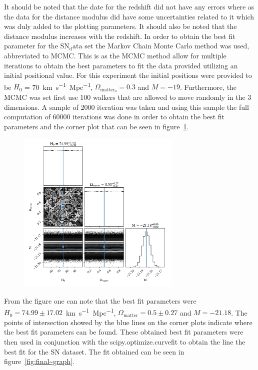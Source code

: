 \documentclass[12pt, a4paper]{article}
\begin{document}
It should be noted that the date for the redshift did not have any errors where as the data for the distance modulus did have some uncertainties related to it which was duly added to the plotting parameters. It should also be noted that the distance modulus increases with the redshift. In order to obtain the best fit parameter for the \(\mathrm{SN_data}\) set the Markov Chain Monte Carlo method was used, abbreviated to MCMC. This is as the MCMC method allow for multiple iterations to obtain the best parameters to fit the data provided utilizing an initial positional value. For this experiment the initial positions were provided to be \(H_0\) = \qty{70}{km.s^{-1}.Mpc^{-1}}, \(\Omega_{\mathrm{matter_0}} = 0.3\) and \(M=-19\). Furthermore, the MCMC was set first use 100 walkers that are allowed to move randomly in the 3 dimensions. A sample of 2000 iteration was taken and using this sample the full computation of 60000 iterations was done in order to obtain the best fit parameters and the corner plot that can be seen in figure~\ref{fig:corner~plots}. 

\begin{figure}[H]
    \centering
    \includegraphics[width = 0.7\textwidth]{Graph 4.png}
    \label{fig:corner~plots}
\end{figure}

From the figure one can note that the best fit parameters were \(H_0 = 74.99 \pm 17.02\)~\unit{km.s^{-1}.Mpc^{-1}}, \(\Omega_{\mathrm{matter}} = 0.5 \pm 0.27\) and \(M = -21.18\). The points of intersection showed by the blue lines on the corner plots indicate where the best fit parameters can be found. These obtained best fit parameters were then used in conjunction with the scipy.optimize.curvefit to obtain the line the best fit for the SN dataset. The fit obtained can be seen in figure~\ref{fig:final~graph}.
\end{document}
